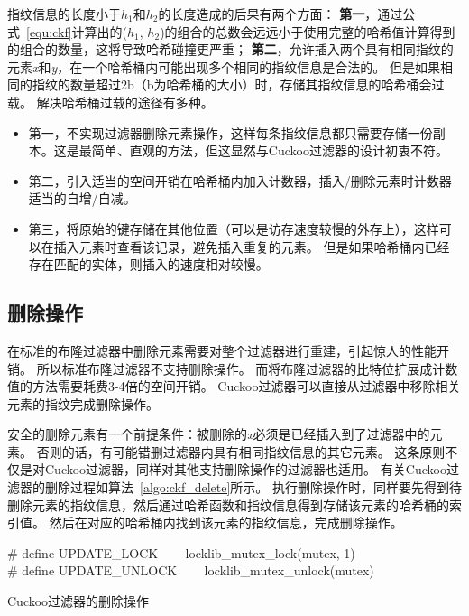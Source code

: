 指纹信息的长度小于$h_1$和$h_2$的长度造成的后果有两个方面：
\textbf{第一}，通过公式~\ref{equ:ckf}计算出的($h_1$, $h_2$)的组合的总数会远远小于使用完整的哈希值计算得到的组合的数量，这将导致哈希碰撞更严重；
\textbf{第二}，允许插入两个具有相同指纹的元素\textit{x}和\textit{y}，在一个哈希桶内可能出现多个相同的指纹信息是合法的。
但是如果相同的指纹的数量超过2b（b为哈希桶的大小）时，存储其指纹信息的哈希桶会过载。
解决哈希桶过载的途径有多种。
\begin{itemize}
	\item 第一，不实现过滤器删除元素操作，这样每条指纹信息都只需要存储一份副本。这是最简单、直观的方法，但这显然与Cuckoo过滤器的设计初衷不符。
	\item 第二，引入适当的空间开销在哈希桶内加入计数器，插入/删除元素时计数器适当的自增/自减。
	\item 第三，将原始的键存储在其他位置（可以是访存速度较慢的外存上），这样可以在插入元素时查看该记录，避免插入重复的元素。
	但是如果哈希桶内已经存在匹配的实体，则插入的速度相对较慢。
\end{itemize}	

\subsection{删除操作}
在标准的布隆过滤器中删除元素需要对整个过滤器进行重建，引起惊人的性能开销。
所以标准布隆过滤器不支持删除操作。
而将布隆过滤器的比特位扩展成计数值的方法需要耗费3-4倍的空间开销。
Cuckoo过滤器可以直接从过滤器中移除相关元素的指纹完成删除操作。

安全的删除元素有一个前提条件：被删除的\textit{x}必须是已经插入到了过滤器中的元素。
否则的话，有可能错删过滤器内具有相同指纹信息的其它元素。
这条原则不仅是对Cuckoo过滤器，同样对其他支持删除操作的过滤器也适用。
有关Cuckoo过滤器的删除过程如算法~\ref{algo:ckf_delete}所示。
执行删除操作时，同样要先得到待删除元素的指纹信息，然后通过哈希函数和指纹信息得到存储该元素的哈希桶的索引值。
然后在对应的哈希桶内找到该元素的指纹信息，完成删除操作。

\begin{algorithm}[htbp]
\SetAlgoLined
\# define UPDATE\_LOCK ~~~ locklib\_mutex\_lock(mutex, 1)\\
\# define UPDATE\_UNLOCK ~~~ locklib\_mutex\_unlock(mutex)\\
\caption{Cuckoo过滤器的删除操作}
\label{algo:ckf_delete}
\end{algorithm}

